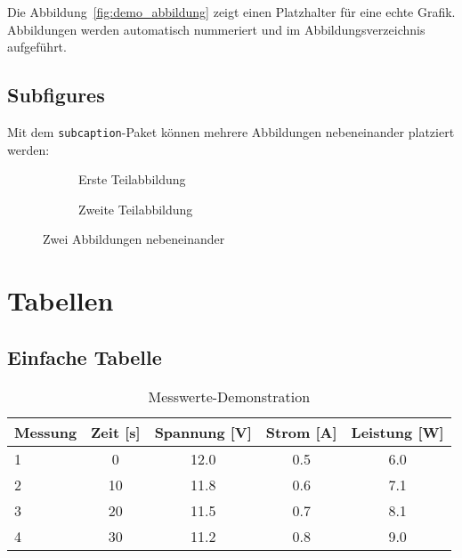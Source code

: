 Die Abbildung~\ref{fig:demo_abbildung} zeigt einen Platzhalter für eine echte Grafik. Abbildungen werden automatisch nummeriert und im Abbildungsverzeichnis aufgeführt.

\subsection{Subfigures}
\label{subsec:subfigures}

Mit dem \texttt{subcaption}-Paket können mehrere Abbildungen nebeneinander platziert werden:

\begin{figure}[h]
	\centering
	\begin{subfigure}[b]{0.45\textwidth}
		\centering
		\caption{Erste Teilabbildung}
		\label{fig:sub1}
	\end{subfigure}
	\hfill
	\begin{subfigure}[b]{0.45\textwidth}
		\centering
		\caption{Zweite Teilabbildung}
		\label{fig:sub2}
	\end{subfigure}
	\caption{Zwei Abbildungen nebeneinander}
	\label{fig:subfigures_demo}
\end{figure}

\section{Tabellen}
\label{sec:tabellen_demo}

\subsection{Einfache Tabelle}
\label{subsec:einfache_tabelle}

\begin{table}[h]
	\centering
	\caption{Messwerte-Demonstration}
	\label{tab:messwerte}
	\begin{tabular}{|l|c|c|c|c|}
		\hline
		\textbf{Messung} & \textbf{Zeit [s]} & \textbf{Spannung [V]} & \textbf{Strom [A]} & \textbf{Leistung [W]} \\
		\hline
		1                & 0                 & 12.0                  & 0.5                & 6.0                   \\
		2                & 10                & 11.8                  & 0.6                & 7.1                   \\
		3                & 20                & 11.5                  & 0.7                & 8.1                   \\
		4                & 30                & 11.2                  & 0.8                & 9.0                   \\
		\hline
	\end{tabular}
\end{table}

